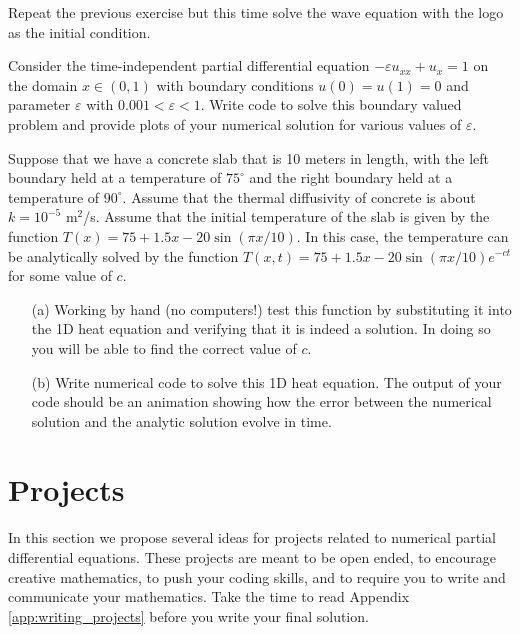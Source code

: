 \begin{problem}
    Repeat the previous exercise but this time solve the wave equation with the logo as the
    initial condition.
\end{problem}






\begin{problem}
    Consider the time-independent partial differential equation $-\varepsilon u_{xx} +
    u_x = 1$ on the domain $x \in (0,1)$ with boundary conditions $u(0) = u(1) = 0$ and
    parameter $\varepsilon$ with $0.001<\varepsilon<1$.
    Write code to solve this boundary valued problem and provide plots of your numerical
    solution for various values of $\varepsilon$. 
\end{problem}


\begin{problem}
    Suppose that we have a concrete slab that is 10 meters in length, with the left
    boundary held at a temperature of $75^\circ$ and the right boundary held at a
    temperature of $90^\circ$.  Assume that the thermal diffusivity of concrete is about
    $k = 10^{-5}$ m$^2$/s.  Assume that the initial temperature of the slab is given by
    the function $T(x) = 75 + 1.5x - 20 \sin( \pi x / 10)$.  In this case, the temperature
    can be analytically solved by the function $T(x,t) = 75 + 1.5x - 20 \sin(\pi x / 10)
    e^{-ct}$ for some value of $c$.  
    \begin{enumerate}
        \item[(a)] Working by hand (no computers!) test this function by substituting it
            into the 1D heat equation and verifying that it is indeed a solution.  In
            doing so you will be able to find the correct value of $c$.
        \item[(b)] Write numerical code to solve this 1D heat equation.  The output of
            your code should be an animation showing how the error between the numerical
            solution and the analytic solution evolve in time.
    \end{enumerate}
\end{problem}


\newpage\section{Projects}
In this section we propose several ideas for projects related to numerical partial
differential equations.  These projects are meant to be open ended, to encourage creative
mathematics, to push your coding skills, and to require you to write and communicate your
mathematics.  Take the time to read Appendix \ref{app:writing_projects} before you write
your final solution.




